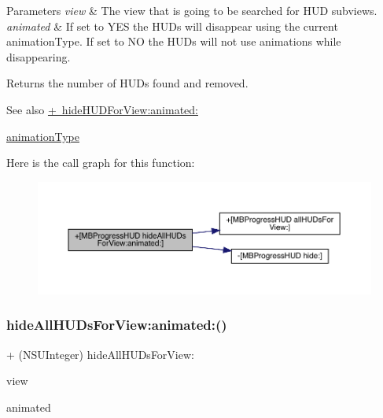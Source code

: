 \begin{DoxyParams}{Parameters}
{\em view} & The view that is going to be searched for H\+UD subviews. \\
\hline
{\em animated} & If set to Y\+ES the H\+U\+Ds will disappear using the current animation\+Type. If set to NO the H\+U\+Ds will not use animations while disappearing. \\
\hline
\end{DoxyParams}
\begin{DoxyReturn}{Returns}
the number of H\+U\+Ds found and removed.
\end{DoxyReturn}
\begin{DoxySeeAlso}{See also}
\mbox{\hyperlink{interface_m_b_progress_h_u_d_a7b0826c34eea1a15d62aabd00c249666}{+ hide\+H\+U\+D\+For\+View\+:animated\+:}} 

\mbox{\hyperlink{interface_m_b_progress_h_u_d_a71d04bb9e2839df9377ad10d03b2e468}{animation\+Type}} 
\end{DoxySeeAlso}
Here is the call graph for this function\+:\nopagebreak
\begin{figure}[H]
\begin{center}
\leavevmode
\includegraphics[width=350pt]{interface_m_b_progress_h_u_d_a24782426046cf6dda1534c2d27750454_cgraph}
\end{center}
\end{figure}
\mbox{\label{interface_m_b_progress_h_u_d_a24782426046cf6dda1534c2d27750454}} 
\subsubsection{\texorpdfstring{hide\+All\+H\+U\+Ds\+For\+View\+:animated\+:()}{hideAllHUDsForView:animated:()}\hspace{0.1cm}{\footnotesize\ttfamily [2/3]}}
{\footnotesize\ttfamily + (N\+S\+U\+Integer) hide\+All\+H\+U\+Ds\+For\+View\+: \begin{DoxyParamCaption}\item[{(U\+I\+View $\ast$)}]{view }\item[{animated:(B\+O\+OL)}]{animated }\end{DoxyParamCaption}}

